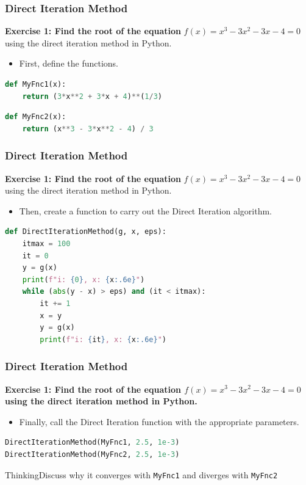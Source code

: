   
  \begin{frame}[fragile]
  \frametitle{Direct Iteration Method}

  \textbf{Exercise 1: Find the root of the equation}
    \(
    f(x) = x^3 - 3x^2 - 3x - 4 = 0
    \)
    using the direct iteration method in Python.
  \begin{itemize}
    \item First, define the functions.
  \end{itemize}
  \begin{lstlisting}[language=Python]
def MyFnc1(x):
    return (3*x**2 + 3*x + 4)**(1/3)
  \end{lstlisting}
  \begin{lstlisting}[language=Python]
def MyFnc2(x):
    return (x**3 - 3*x**2 - 4) / 3
  \end{lstlisting}
\end{frame}

\begin{frame}[fragile]
  \frametitle{Direct Iteration Method}

  \textbf{Exercise 1: Find the root of the equation}
    \(
    f(x) = x^3 - 3x^2 - 3x - 4 = 0
    \)
    using the direct iteration method in Python.
  \begin{itemize}
    \item Then, create a function to carry out the Direct Iteration algorithm.
  \end{itemize}
  \begin{lstlisting}[language=Python]
def DirectIterationMethod(g, x, eps):
    itmax = 100
    it = 0
    y = g(x)
    print(f"i: {0}, x: {x:.6e}")
    while (abs(y - x) > eps) and (it < itmax):
        it += 1
        x = y
        y = g(x)
        print(f"i: {it}, x: {x:.6e}")
  \end{lstlisting}
\end{frame}

\begin{frame}[fragile]
  \frametitle{Direct Iteration Method}
  \textbf{Exercise 1: Find the root of the equation
    \(
    f(x) = x^3 - 3x^2 - 3x - 4 = 0
    \)
    using the direct iteration method in Python.}

  \begin{itemize}
    \item Finally, call the Direct Iteration function with the appropriate parameters.
  \end{itemize}
  \begin{lstlisting}[language=Python]
DirectIterationMethod(MyFnc1, 2.5, 1e-3)
DirectIterationMethod(MyFnc2, 2.5, 1e-3)
  \end{lstlisting}
  \begin{block}{Thinking}Discuss why it converges with \texttt{MyFnc1} and diverges with \texttt{MyFnc2}\end{block}
\end{frame}


